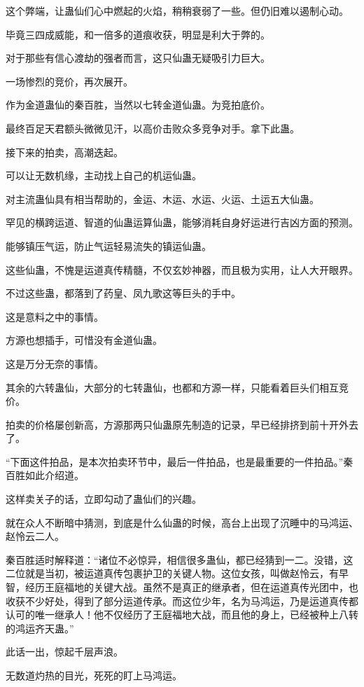 \begin{this_body}
这个弊端，让蛊仙们心中燃起的火焰，稍稍衰弱了一些。但仍旧难以遏制心动。

毕竟三四成威能，和一倍多的道痕收获，明显是利大于弊的。

对于那些有信心渡劫的强者而言，这只仙蛊无疑吸引力巨大。

一场惨烈的竞价，再次展开。

作为金道蛊仙的秦百胜，当然以七转金道仙蛊。为竞拍底价。

最终百足天君额头微微见汗，以高价击败众多竞争对手。拿下此蛊。

接下来的拍卖，高潮迭起。

可以让无数机缘，主动找上自己的机运仙蛊。

对主流蛊仙具有相当帮助的，金运、木运、水运、火运、土运五大仙蛊。

罕见的横跨运道、智道的仙蛊运算仙蛊，能够消耗自身好运进行吉凶方面的预测。

能够镇压气运，防止气运轻易流失的镇运仙蛊。

这些仙蛊，不愧是运道真传精髓，不仅玄妙神器，而且极为实用，让人大开眼界。

不过这些蛊，都落到了药皇、凤九歌这等巨头的手中。

这是意料之中的事情。

方源也想插手，可惜没有金道仙蛊。

这是万分无奈的事情。

其余的六转蛊仙，大部分的七转蛊仙，也都和方源一样，只能看着巨头们相互竞价。

拍卖的价格屡创新高，方源那两只仙蛊原先制造的记录，早已经排挤到前十开外去了。

“下面这件拍品，是本次拍卖环节中，最后一件拍品，也是最重要的一件拍品。”秦百胜如此介绍道。

这样卖关子的话，立即勾动了蛊仙们的兴趣。

就在众人不断暗中猜测，到底是什么仙蛊的时候，高台上出现了沉睡中的马鸿运、赵怜云二人。

秦百胜适时解释道：“诸位不必惊异，相信很多蛊仙，都已经猜到一二。没错，这二位就是当初，被运道真传包裹护卫的关键人物。这位女孩，叫做赵怜云，有早智，经历王庭福地的关键大战。虽然不是真正的继承者，但在运道真传光团中，也收获不少好处，得到了部分运道传承。而这位少年，名为马鸿运，乃是运道真传都认可的唯一继承人！他不仅经历了王庭福地大战，而且他的身上，已经被种上八转的鸿运齐天蛊。”

此话一出，惊起千层声浪。

无数道灼热的目光，死死的盯上马鸿运。


\end{this_body}
